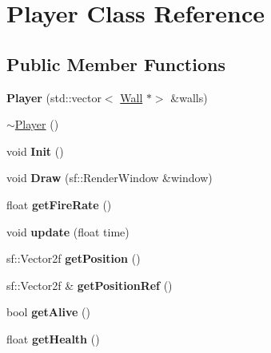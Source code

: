 \hypertarget{class_player}{}\section{Player Class Reference}
\label{class_player}
\subsection*{Public Member Functions}
\begin{DoxyCompactItemize}
\item 
\mbox{\label{class_player_aa6ba3005051279dc1d45ac615f197ef5}} 
{\bfseries Player} (std\+::vector$<$ \mbox{\hyperlink{class_wall}{Wall}} $\ast$$>$ \&walls)
\item 
\mbox{\hyperlink{class_player_a749d2c00e1fe0f5c2746f7505a58c062}{$\sim$\+Player}} ()
\item 
\mbox{\label{class_player_a4523bf2e637fcb0e36a3f456ec397e7d}} 
void {\bfseries Init} ()
\item 
\mbox{\label{class_player_a6a0b48c845f9c341283b5fc5a7898f9b}} 
void {\bfseries Draw} (sf\+::\+Render\+Window \&window)
\item 
\mbox{\label{class_player_ac81962f3fcd0c78c2da40e0bfec9466f}} 
float {\bfseries get\+Fire\+Rate} ()
\item 
\mbox{\label{class_player_a194b7082791d882887071d8d2893c5e4}} 
void {\bfseries update} (float time)
\item 
\mbox{\label{class_player_a23356f99a9de86d3d47eadb679b332dc}} 
sf\+::\+Vector2f {\bfseries get\+Position} ()
\item 
\mbox{\label{class_player_a34f7a992b128e39efd89821a9269b309}} 
sf\+::\+Vector2f \& {\bfseries get\+Position\+Ref} ()
\item 
\mbox{\label{class_player_aa45f751e7ba8afcd9894d57ef4813d50}} 
bool {\bfseries get\+Alive} ()
\item 
\mbox{\label{class_player_a2d1542816021d46bf0d007d57a2c7291}} 
float {\bfseries get\+Health} ()
$$
\end{DoxyCompactItemize}
